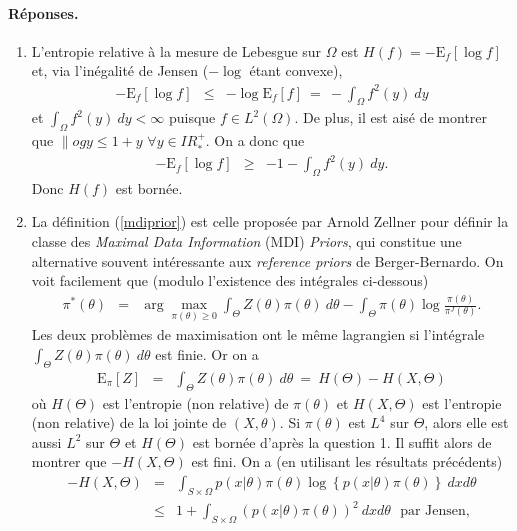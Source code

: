 \documentclass[10pt]{article}
\newcommand{\R}{I\!\!R}
\newcommand{\E}{\mbox{E}}
\newcommand{\1}{\mathbbm{1}}
\begin{document}
\paragraph{\bf Réponses.}
\begin{enumerate}
\item L'entropie relative à la mesure de Lebesgue sur $\Omega$ est $H(f)=-\E_f[\log f] $ et, via l'inégalité de Jensen ($-\log $ étant convexe), 
\begin{eqnarray*}
-\E_f[\log f] & \leq & -\log \E_f[ f] \ = \ -\int_{\Omega} f^2(y) \ dy
\end{eqnarray*}
et $\int_{\Omega} f^2(y) \ dy < \infty$ puisque  $f\in L^2(\Omega)$. De plus, il est aisé de montrer que  $\|og y \leq 1 + y$ $\forall y\in \R^+_*$. On a donc que
\begin{eqnarray*}
-\E_f[\log f]  & \geq & -1 - \int_{\Omega} f^2(y) \ dy.
\end{eqnarray*}
Donc $H(f)$ est bornée. 
\item La définition (\ref{mdiprior}) est celle proposée par Arnold Zellner pour définir la classe des {\it Maximal Data Information} (MDI) {\it Priors}, qui constitue une alternative souvent intéressante aux {\it reference priors} de Berger-Bernardo. On voit facilement que (modulo l'existence des intégrales ci-dessous) 
 \begin{eqnarray*}
\pi^*(\theta) & = & \arg\max\limits_{\pi(\theta)\geq 0}  \int_{\Theta} Z(\theta) \pi(\theta) \ d\theta - \int_{\Theta}
\pi(\theta) \log \frac{\pi(\theta)}{\pi^J(\theta)}. 
\end{eqnarray*}
Les deux problèmes de maximisation ont le même lagrangien si l'intégrale $\int_{\Theta} Z(\theta) \pi(\theta) \ d\theta $ est finie. Or on a
\begin{eqnarray*}
\E_{\pi}[Z] & = & \int_{\Theta} Z(\theta) \pi(\theta) \ d \theta \ = \ H(\Theta) - H(X,\Theta)
\end{eqnarray*}
où $H(\Theta)$ est l'entropie (non relative) de $\pi(\theta)$ et  $H(X,\Theta)$ est l'entropie (non relative) de la loi jointe de $(X,\theta)$. Si $\pi(\theta)$ est $L^4$ sur $\Theta$, alors elle est aussi $L^2$ sur $\Theta$ et  $H(\Theta)$ est bornée d'après la question 1. Il suffit alors de montrer que $- H(X,\Theta)$ est fini. On a (en utilisant les résultats précédents)
\begin{eqnarray*}
- H(X,\Theta) & = & \int_{S \times \Omega} p(x|\theta) \pi(\theta) \log \left\{ p(x|\theta) \pi(\theta) \right\} \ dx d\theta \\
& \leq & 1 + \int_{S \times \Omega} \left(p(x|\theta) \pi(\theta)\right)^2  \ dx d\theta \ \ \ \text{par Jensen}, \\

\end{eqnarray*}
\end{enumerate}
\end{document}

